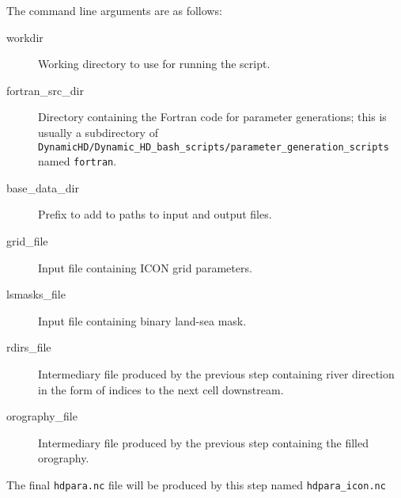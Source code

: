 \documentclass{article}
\begin{document}
\begin{enumerate}
\begin{lstlisting}[style=bash_input,breaklines=true]
\end{lstlisting} 
The command line arguments are as follows:
\begin{description}
\item[workdir] Working directory to use for running the script.
\item[fortran\_src\_dir] Directory containing the Fortran code for parameter generations; this is usually a subdirectory of  \lstinline[style=bash_input]{DynamicHD/Dynamic_HD_bash_scripts/parameter_generation_scripts} named \lstinline[style=bash_input]{fortran}.
\item[base\_data\_dir] Prefix to add to paths to input and output files.
\item[grid\_file] Input file containing ICON grid parameters.
\item[lsmasks\_file] Input file containing binary land-sea mask.
\item[rdirs\_file] Intermediary file produced by the previous step containing river direction in the form of indices to the next cell downstream.
\item[orography\_file] Intermediary file produced by the previous step containing the filled orography.
\end{description}
The final \lstinline[style=bash_input]{hdpara.nc} file will be produced by this step named \lstinline[style=bash_input]{hdpara_icon.nc}
\end{enumerate}


{}

\end{document}
